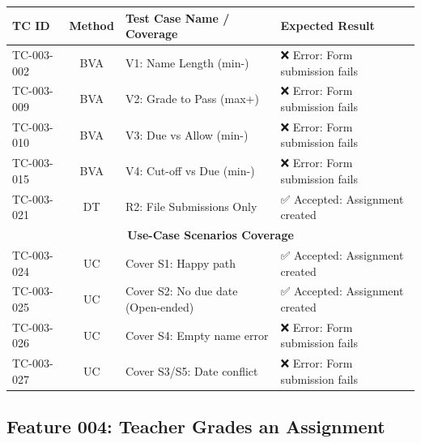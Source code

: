 \documentclass[twoside,final]{hcmut-report}
\begin{document}
\begin{table}[H]
\centering
\renewcommand{\arraystretch}{1.2}
\begin{tabularx}{\textwidth}{|l|c|X|X|}
\hline
\textbf{TC ID} & \textbf{Method} & \textbf{Test Case Name / Coverage} & \textbf{Expected Result} \\ \hline
TC-003-002 & BVA & V1: Name Length (min-) & ❌ Error: Form submission fails \\ \hline
TC-003-009 & BVA & V2: Grade to Pass (max+) & ❌ Error: Form submission fails \\ \hline
TC-003-010 & BVA & V3: Due vs Allow (min-) & ❌ Error: Form submission fails \\ \hline
TC-003-015 & BVA & V4: Cut-off vs Due (min-) & ❌ Error: Form submission fails \\ \hline
TC-003-021 & DT  & R2: File Submissions Only & ✅ Accepted: Assignment created \\ \hline
\multicolumn{4}{|c|}{\cellcolor{gray!20}\textbf{Use-Case Scenarios Coverage}} \\ \hline
TC-003-024 & UC & Cover S1: Happy path & ✅ Accepted: Assignment created \\ \hline
TC-003-025 & UC & Cover S2: No due date (Open-ended) & ✅ Accepted: Assignment created \\ \hline
TC-003-026 & UC & Cover S4: Empty name error & ❌ Error: Form submission fails \\ \hline
TC-003-027 & UC & Cover S3/S5: Date conflict & ❌ Error: Form submission fails \\ \hline
\end{tabularx}
\end{table}

\subsection{Feature 004: Teacher Grades an Assignment}
\end{document}
